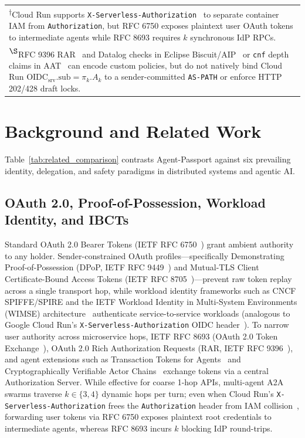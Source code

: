 \documentclass[conference,10pt]{IEEEtran}
\begin{document}
\begin{table}[t]
{\begin{tabular}{lccccccc}
\bottomrule
\multicolumn{8}{l}{\tiny \textsuperscript{$\dagger$}Cloud Run supports \texttt{X-Serverless-Authorization}~\cite{tsao2023cloudrun} to separate container IAM from \texttt{Authorization}, but RFC 6750 exposes plaintext user OAuth tokens to intermediate agents while RFC 8693 requires $k$ synchronous IdP RPCs.} \\
\multicolumn{8}{l}{\tiny \textsuperscript{$\S$}RFC 9396 RAR~\cite{lodderstedt2023rar} and Datalog checks in Eclipse Biscuit/AIP~\cite{prakash2026aip} or \texttt{cnf} depth claims in AAT~\cite{niyikiza2026aat} can encode custom policies, but do not natively bind Cloud Run $\text{OIDC}_{\text{srv}}.\text{sub} = \pi_k.A_k$ to a sender-committed \texttt{AS-PATH} or enforce HTTP 202/428 draft locks.}
\end{tabular}%
}
\end{table}

\section{Background and Related Work}
Table~\ref{tab:related_comparison} contrasts Agent-Passport against six prevailing identity, delegation, and safety paradigms in distributed systems and agentic AI.

\subsection{OAuth 2.0, Proof-of-Possession, Workload Identity, and IBCTs}
Standard OAuth 2.0 Bearer Tokens (IETF RFC 6750~\cite{jones2012rfc6750}) grant ambient authority to any holder. Sender-constrained OAuth profiles---specifically Demonstrating Proof-of-Possession (DPoP, IETF RFC 9449~\cite{fett2023dpop}) and Mutual-TLS Client Certificate-Bound Access Tokens (IETF RFC 8705~\cite{campbell2020mtls})---prevent raw token replay across a single transport hop, while workload identity frameworks such as CNCF SPIFFE/SPIRE and the IETF Workload Identity in Multi-System Environments (WIMSE) architecture~\cite{salowey2026wimse} authenticate service-to-service workloads (analogous to Google Cloud Run's \texttt{X-Serverless-Authorization} OIDC header~\cite{tsao2023cloudrun}). To narrow user authority across microservice hops, IETF RFC 8693 (OAuth 2.0 Token Exchange~\cite{jones2020rfc8693}), OAuth 2.0 Rich Authorization Requests (RAR, IETF RFC 9396~\cite{lodderstedt2023rar}), and agent extensions such as Transaction Tokens for Agents~\cite{raut2026transaction} and Cryptographically Verifiable Actor Chains~\cite{prasad2026actor} exchange tokens via a central Authorization Server. While effective for coarse 1-hop APIs, multi-agent A2A swarms traverse $k \in \{3, 4\}$ dynamic hops per turn; even when Cloud Run's \texttt{X-Serverless-Authorization} frees the \texttt{Authorization} header from IAM collision~\cite{tsao2023cloudrun}, forwarding user tokens via RFC 6750 exposes plaintext root credentials to intermediate agents, whereas RFC 8693 incurs $k$ blocking IdP round-trips.
\end{document}

